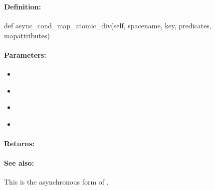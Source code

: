 \pagebreak
\subsubsection{}
\label{api:python:async_cond_map_atomic_div}


\paragraph{Definition:}
\begin{pythoncode}
def async_cond_map_atomic_div(self, spacename, key, predicates, mapattributes)
\end{pythoncode}

\paragraph{Parameters:}
\begin{itemize}[noitemsep]
\item {}\\

\item {}\\

\item {}\\

\item {}\\

\end{itemize}

\paragraph{Returns:}


\paragraph{See also:}  This is the asynchronous form of .

\pagebreak
\subsubsection{}
\label{api:python:map_atomic_mod}


